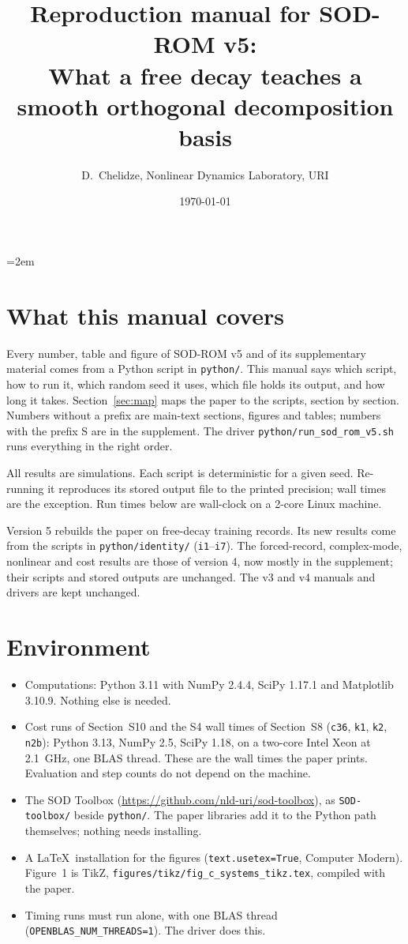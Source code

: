 \documentclass[10pt]{article}
\title{Reproduction manual for SOD-ROM v5:\\ \large What a free decay teaches a smooth orthogonal decomposition basis}
\author{D.~Chelidze, Nonlinear Dynamics Laboratory, URI}
\date{\today}
\newcommand{\f}[1]{\texttt{#1}}
\begin{document}
\emergencystretch=2em
\maketitle

\section{What this manual covers}
Every number, table and figure of SOD-ROM v5 and of its supplementary material comes from a Python script in \f{python/\allowbreak{}}.
This manual says which script, how to run it, which random seed it uses, which file holds its output, and how long it takes.
Section~\ref{sec:map} maps the paper to the scripts, section by section. Numbers without a prefix are main-text sections, figures and tables; numbers with the prefix S are in the supplement.
The driver \f{python/\allowbreak{}run\_\allowbreak{}sod\_\allowbreak{}rom\_\allowbreak{}v5.sh} runs everything in the right order.

All results are simulations. Each script is deterministic for a given seed. Re-running it reproduces its stored output file to the printed precision; wall times are the exception.
Run times below are wall-clock on a 2-core Linux machine.

Version 5 rebuilds the paper on free-decay training records. Its new results come from the scripts in \f{python/\allowbreak{}identity/\allowbreak{}} (\f{i1}--\f{i7}). The forced-record, complex-mode, nonlinear and cost results are those of version 4, now mostly in the supplement; their scripts and stored outputs are unchanged. The v3 and v4 manuals and drivers are kept unchanged.

\section{Environment}
\begin{itemize}
\item Computations: Python 3.11 with NumPy 2.4.4, SciPy 1.17.1 and Matplotlib 3.10.9. Nothing else is needed.
\item Cost runs of Section~S10 and the S4 wall times of Section~S8 (\f{c36}, \f{k1}, \f{k2}, \f{n2b}): Python 3.13, NumPy 2.5, SciPy 1.18, on a two-core Intel Xeon at 2.1~GHz, one BLAS thread. These are the wall times the paper prints. Evaluation and step counts do not depend on the machine.
\item The SOD Toolbox (\url{https://github.com/nld-uri/sod-toolbox}), as \f{SOD-toolbox/\allowbreak{}} beside \f{python/\allowbreak{}}. The paper libraries add it to the Python path themselves; nothing needs installing.
\item A \LaTeX\ installation for the figures (\f{text.usetex=True}, Computer Modern). Figure~1 is TikZ, \f{figures/\allowbreak{}tikz/\allowbreak{}fig\_\allowbreak{}c\_\allowbreak{}systems\_\allowbreak{}tikz.tex}, compiled with the paper.
\item Timing runs must run alone, with one BLAS thread (\f{OPENBLAS\_\allowbreak{}NUM\_\allowbreak{}THREADS=1}). The driver does this.
\end{itemize}
\end{document}
